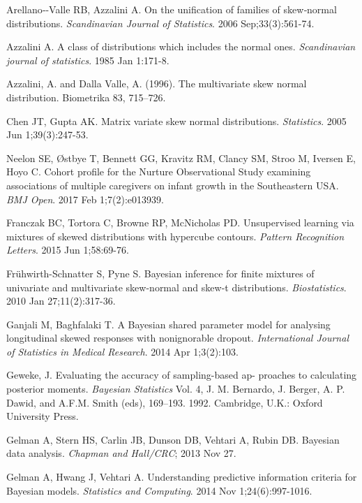 \documentclass[useAMS,referee]{biom}
\begin{document}
\begin{thebibliography}{}

\bibitem{ } Arellano‐-Valle RB, Azzalini A. On the unification of families of skew‐normal distributions. \textit{Scandinavian Journal of Statistics}. 2006 Sep;33(3):561-74.

\bibitem{ } Azzalini A. A class of distributions which includes the normal ones. \textit{Scandinavian journal of statistics}. 1985 Jan 1:171-8.

\bibitem{ } Azzalini, A. and Dalla Valle, A. (1996). The multivariate skew normal distribution. Biometrika 83, 715–726.

\bibitem{ } Chen JT, Gupta AK. Matrix variate skew normal distributions. \textit{Statistics}. 2005 Jun 1;39(3):247-53.

\bibitem{ } Neelon SE, \O stbye T, Bennett GG, Kravitz RM, Clancy SM, Stroo M, Iversen E, Hoyo C. Cohort profile for the Nurture Observational Study examining associations of multiple caregivers on infant growth in the Southeastern USA. \textit{BMJ Open}. 2017 Feb 1;7(2):e013939.

\bibitem{ } Franczak BC, Tortora C, Browne RP, McNicholas PD. Unsupervised learning via mixtures of skewed distributions with hypercube contours. \textit{Pattern Recognition Letters}. 2015 Jun 1;58:69-76.

\bibitem{ } Fr\"{u}hwirth-Schnatter S, Pyne S. Bayesian inference for finite mixtures of univariate and multivariate skew-normal and skew-t distributions. \textit{Biostatistics}. 2010 Jan 27;11(2):317-36.

\bibitem{ } Ganjali M, Baghfalaki T. A Bayesian shared parameter model for analysing longitudinal skewed responses with nonignorable dropout. \textit{International Journal of Statistics in Medical Research}. 2014 Apr 1;3(2):103.

\bibitem{ } Geweke, J. Evaluating the accuracy of sampling-based ap- proaches to calculating posterior moments. \textit{Bayesian Statistics} Vol. 4, J. M. Bernardo, J. Berger, A. P. Dawid, and A.F.M. Smith (eds), 169–193. 1992. Cambridge, U.K.: Oxford University Press.

\bibitem{ } Gelman A, Stern HS, Carlin JB, Dunson DB, Vehtari A, Rubin DB. Bayesian data analysis. \textit{Chapman and Hall/CRC}; 2013 Nov 27.

\bibitem{ } Gelman A, Hwang J, Vehtari A. Understanding predictive information criteria for Bayesian models. \textit{Statistics and Computing}. 2014 Nov 1;24(6):997-1016.


\end{thebibliography}
\end{document}
